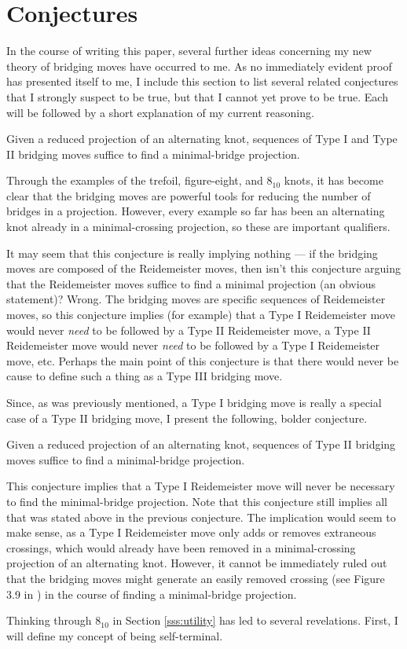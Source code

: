 \documentclass[titlepage]{article}
\begin{document}
\section{Conjectures}
In the course of writing this paper, several further ideas concerning my new theory of bridging moves have occurred to me. As no immediately evident proof has presented itself to me, I include this section to list several related conjectures that I strongly suspect to be true, but that I cannot yet prove to be true. Each will be followed by a short explanation of my current reasoning.

\begin{conj}
    Given a reduced projection of an alternating knot, sequences of Type I and Type II bridging moves suffice to find a minimal-bridge projection.
\end{conj}

Through the examples of the trefoil, figure-eight, and $8_{10}$ knots, it has become clear that the bridging moves are powerful tools for reducing the number of bridges in a projection. However, every example so far has been an alternating knot already in a minimal-crossing projection, so these are important qualifiers.\par
It may seem that this conjecture is really implying nothing --- if the bridging moves are composed of the Reidemeister moves, then isn't this conjecture arguing that the Reidemeister moves suffice to find a minimal projection (an obvious statement)? Wrong. The bridging moves are specific sequences of Reidemeister moves, so this conjecture implies (for example) that a Type I Reidemeister move would never \emph{need} to be followed by a Type II Reidemeister move, a Type II Reidemeister move would never \emph{need} to be followed by a Type I Reidemeister move, etc. Perhaps the main point of this conjecture is that there would never be cause to define such a thing as a Type III bridging move.\par
Since, as was previously mentioned, a Type I bridging move is really a special case of a Type II bridging move, I present the following, bolder conjecture.

\begin{conj}
    Given a reduced projection of an alternating knot, sequences of Type II bridging moves suffice to find a minimal-bridge projection.
\end{conj}

This conjecture implies that a Type I Reidemeister move will never be necessary to find the minimal-bridge projection. Note that this conjecture still implies all that was stated above in the previous conjecture. The implication would seem to make sense, as a Type I Reidemeister move only adds or removes extraneous crossings, which would already have been removed in a minimal-crossing projection of an alternating knot. However, it cannot be immediately ruled out that the bridging moves might generate an easily removed crossing (see Figure 3.9 in \cite{bib:knotnotes}) in the course of finding a minimal-bridge projection.\par
Thinking through $8_{10}$ in Section \ref{sss:utility} has led to several revelations. First, I will define my concept of being self-terminal.
\end{document}
